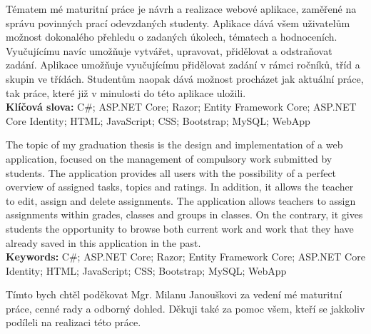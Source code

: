 \documentclass[a4paper, 12pt]{report}
\begin{document}
	\titulniStrana

	\newpage\null\thispagestyle{empty}\newpage
	\newpage\null\thispagestyle{empty}\newpage
	\newpage\null\thispagestyle{empty}\newpage

	\anotace Tématem mé maturitní práce je návrh a realizace webové aplikace, zaměřené na správu povinných prací odevzdaných studenty. Aplikace dává všem uživatelům možnost dokonalého přehledu o zadaných úkolech, tématech a hodnoceních. Vyučujícímu navíc umožňuje vytvářet, upravovat, přidělovat a  odstraňovat zadání. Aplikace umožňuje vyučujícímu přidělovat zadání v rámci ročníků, tříd a skupin ve třídách. Studentům naopak dává možnost procházet jak aktuální práce, tak práce, které již v minulosti do této aplikace uložili.\\
	\textbf{Klíčová slova: } C\#; ASP.NET Core; Razor; Entity Framework Core; ASP.NET Core Identity; HTML; JavaScript; CSS; Bootstrap; MySQL; WebApp

	\annotation The topic of my graduation thesis is the design and implementation of a web application, focused on the management of compulsory work submitted by students. The application provides all users with the possibility of a perfect overview of assigned tasks, topics and ratings. In addition, it allows the teacher to edit, assign and delete assignments. The application allows teachers to assign assignments within grades, classes and groups in classes. On the contrary, it gives students the opportunity to browse both current work and work that they have already saved in this application in the past.\\
	\textbf{Keywords: } C\#; ASP.NET Core; Razor; Entity Framework Core; ASP.NET Core Identity; HTML; JavaScript; CSS; Bootstrap; MySQL; WebApp


	\podekovani Tímto bych chtěl poděkovat Mgr. Milanu Janouškovi za vedení mé maturitní práce, cenné rady a odborný dohled. Děkuji také za pomoc všem, kteří se jakkoliv podíleli na realizaci této práce.
	
	\obsah
\end{document}
